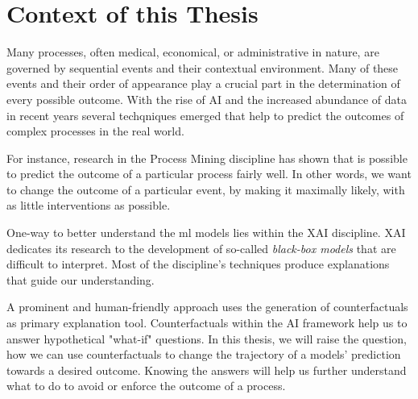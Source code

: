 \documentclass[../../paper.tex]{subfiles}
\begin{document}
\section{Context of this Thesis}
Many processes, often medical, economical, or administrative in nature, are governed by sequential events and their contextual environment. Many of these events and their order of appearance play a crucial part in the determination of every possible outcome. With the rise of AI and the increased abundance of data in recent years several techqniques emerged that help to predict the outcomes of complex processes in the real world.

For instance, research in the Process Mining discipline has shown that is possible to predict the outcome of a particular process fairly well\needscite.  In other words, we want to change the outcome of a particular event, by making it maximally likely, with as little interventions as possible. 

One-way to better understand the \gls{ml} models lies within the \gls{XAI} discipline. \gls{XAI} dedicates its research to the  development of so-called \emph{black-box models} that are  difficult to interpret. Most of the discipline's techniques produce explanations that guide our understanding.

A prominent and human-friendly approach uses the generation of counterfactuals as primary explanation tool. Counterfactuals within the AI framework help us to answer hypothetical "what-if" questions. In this thesis, we will raise the question, how we can use counterfactuals to change the trajectory of a models' prediction towards a desired outcome.  
Knowing the answers will help us further understand what to do to avoid or enforce the outcome of a process.
\end{document}
